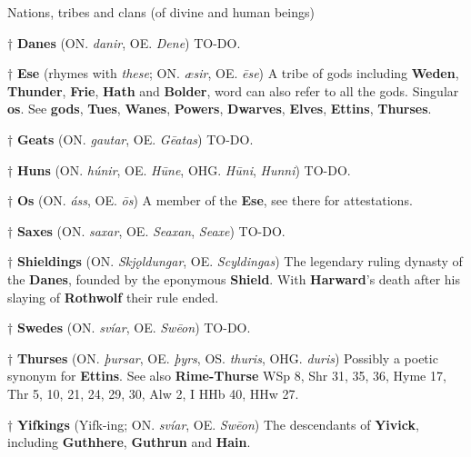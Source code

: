 Nations, tribes and clans (of divine and human beings)

† \textbf{Danes} (ON. \emph{danir}, OE. \emph{Dene})
 TO-DO.

† \textbf{Ese} (rhymes with \emph{these}; ON. \emph{æsir}, OE. \emph{ēse})
 A tribe of gods including \textbf{Weden}, \textbf{Thunder}, \textbf{Frie}, \textbf{Hath} and \textbf{Bolder}, word can also refer to all the gods. Singular \textbf{os}. See \textbf{gods}, \textbf{Tues}, \textbf{Wanes}, \textbf{Powers}, \textbf{Dwarves}, \textbf{Elves}, \textbf{Ettins}, \textbf{Thurses}.
 
† \textbf{Geats} (ON. \emph{gautar}, OE. \emph{Gēatas})
 TO-DO.

† \textbf{Huns} (ON. \emph{húnir}, OE. \emph{Hūne}, OHG. \emph{Hūni}, \emph{Hunni})
 TO-DO.
 
† \textbf{Os} (ON. \emph{áss}, OE. \emph{ōs})
 A member of the \textbf{Ese}, see there for attestations.
 
† \textbf{Saxes} (ON. \emph{saxar}, OE. \emph{Seaxan}, \emph{Seaxe})
 TO-DO.
 
† \textbf{Shieldings} (ON. \emph{Skjǫldungar}, OE. \emph{Scyldingas})
 The legendary ruling dynasty of the \textbf{Danes}, founded by the eponymous \textbf{Shield}. With \textbf{Harward}'s death after his slaying of \textbf{Rothwolf} their rule ended.

† \textbf{Swedes} (ON. \emph{svíar}, OE. \emph{Swēon})
 TO-DO.

† \textbf{Thurses} (ON. \emph{þursar}, OE. \emph{þyrs}, OS. \emph{thuris}, OHG. \emph{duris})
 Possibly a poetic synonym for \textbf{Ettins}. See also \textbf{Rime-Thurse}
 WSp 8, Shr 31, 35, 36, Hyme 17, Thr 5, 10, 21, 24, 29, 30, Alw 2, I HHb 40, HHw 27.

† \textbf{Yifkings} (Yifk-ing; ON. \emph{svíar}, OE. \emph{Swēon})
 The descendants of \textbf{Yivick}, including \textbf{Guthhere}, \textbf{Guthrun} and \textbf{Hain}.
